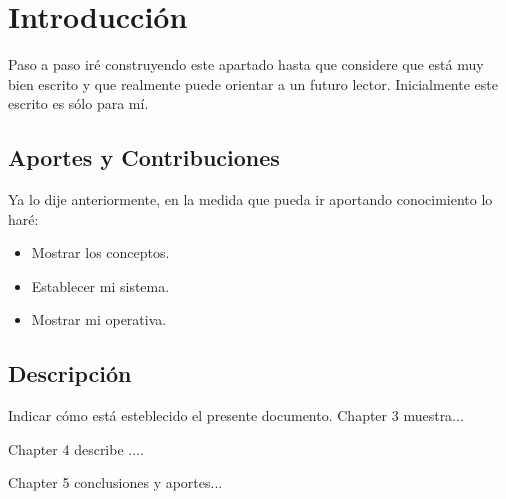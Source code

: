 \chapter{Introducci\'on}

Paso a paso ir\'e construyendo este apartado hasta que considere que est\'a muy bien escrito y que realmente puede orientar a un futuro lector. Inicialmente este escrito es s\'olo para m\'i.


\section{Aportes y Contribuciones}
Ya lo dije anteriormente, en la medida que pueda ir aportando conocimiento lo har\'e:
\begin{itemize}
	\item Mostrar los conceptos.
	\item Establecer mi sistema.
	\item Mostrar mi operativa.
\end{itemize}

\section{Descripci\'on}
Indicar c\'omo est\'a esteblecido el presente documento.
Chapter 3 muestra...

Chapter 4 describe ....

Chapter 5 conclusiones y aportes...
